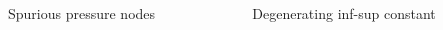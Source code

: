 \begin{frame}
  \frametitle{}
  \begin{columns}[T]
    \begin{column}{0.5\textwidth}
      \begin{block}{Spurious pressure nodes}
        
      \end{block}
    \end{column}
    \begin{column}{0.5\textwidth}
      \begin{block}{Degenerating inf-sup constant}
        
      \end{block}
    \end{column}
  \end{columns}
\end{frame}

